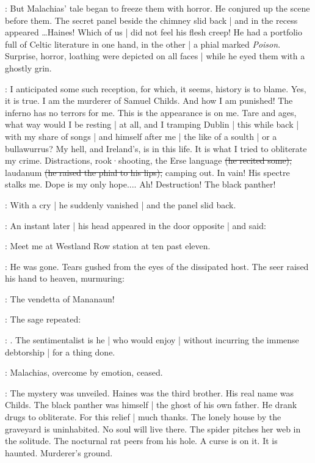 

:
But Malachias' tale began to freeze them with horror.
He conjured up the scene before them.
The secret panel beside the chimney slid back |
and in the recess appeared \dots Haines!
Which of us |
did not feel his flesh creep!
He had a portfolio full of Celtic literature in one hand,
in the other |
a phial marked \emph{Poison}.
Surprise,
horror,
loathing were depicted on all faces |
while he eyed them with a ghostly grin.

\haines:
I anticipated some such reception,
for which,
it seems,
history is to blame.
Yes,
it is true.
I am the murderer of Samuel Childs.
And how I am punished!
The inferno has no terrors for me.
This is the appearance is on me.
Tare and ages,
what way would I be resting |
at all,
and I tramping Dublin |
this while back |
with my share of songs |
and himself after me |
the like of a soulth |
or a bullawurrus?
My hell,
and Ireland's,
is in this life.
It is what I tried to obliterate my crime.
Distractions,
rook·shooting,
the Erse language
\sout{(he recited some),}
laudanum
\sout{(he raised the phial to his lips),}
camping out.
In vain!
His spectre stalks me.
Dope is my only hope....
Ah!
Destruction!
The black panther!

:
With a cry |
he suddenly vanished |
and the panel slid back.

:
An instant later |
his head appeared in the door opposite |
and said:

\haines:
Meet me at Westland Row station at ten past eleven.

:
He was gone.
Tears gushed from the eyes of the dissipated host.
The seer raised his hand to heaven,
murmuring:

\mulligan:
The vendetta of Mananaun!

:
The sage repeated:

\stephen:
.
The sentimentalist is he |
who would enjoy |
without incurring the immense debtorship |
for a thing done.

:
Malachias,
overcome by emotion,
ceased.

:
The mystery was unveiled.
Haines was the third brother.
His real name was Childs.
The black panther was himself |
the ghost of his own father.
He drank drugs to obliterate.
For this relief |
much thanks.
The lonely house by the graveyard is uninhabited.
No soul will live there.
The spider pitches her web in the solitude.
The nocturnal rat peers from his hole.
A curse is on it.
It is haunted.
Murderer's ground.

